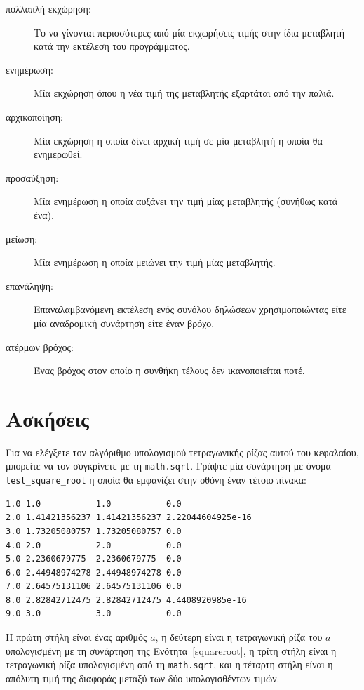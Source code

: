\documentclass[10pt]{book}
\begin{document}
\begin{description}

\item[πολλαπλή εκχώρηση:] Το να γίνονται περισσότερες από μία εκχωρήσεις τιμής στην ίδια μεταβλητή
κατά την εκτέλεση του προγράμματος.

\item[ενημέρωση:] Μία εκχώρηση όπου η νέα τιμή της μεταβλητής εξαρτάται από την παλιά.

\item[αρχικοποίηση:] Μία εκχώρηση η οποία δίνει αρχική τιμή σε μία μεταβλητή η οποία θα ενημερωθεί.

\item[προσαύξηση:] Μία ενημέρωση η οποία αυξάνει την τιμή μίας μεταβλητής (συνήθως κατά ένα).

\item[μείωση:] Μία ενημέρωση η οποία μειώνει την τιμή μίας μεταβλητής.

\item[επανάληψη:] Επαναλαμβανόμενη εκτέλεση ενός συνόλου δηλώσεων χρησιμοποιώντας είτε μία αναδρομική συνάρτηση είτε έναν βρόχο.

\item[ατέρμων βρόχος:] Ένας βρόχος στον οποίο η συνθήκη τέλους δεν ικανοποιείται ποτέ.

\end{description}


\section{Ασκήσεις}

\begin{exercise}

Για να ελέγξετε τον αλγόριθμο υπολογισμού τετραγωνικής ρίζας αυτού του κεφαλαίου, μπορείτε να τον συγκρίνετε με τη {\tt math.sqrt}. Γράψτε μία συνάρτηση με όνομα \verb"test_square_root" η οποία θα εμφανίζει στην οθόνη έναν τέτοιο πίνακα:

\begin{verbatim}
1.0 1.0           1.0           0.0
2.0 1.41421356237 1.41421356237 2.22044604925e-16
3.0 1.73205080757 1.73205080757 0.0
4.0 2.0           2.0           0.0
5.0 2.2360679775  2.2360679775  0.0
6.0 2.44948974278 2.44948974278 0.0
7.0 2.64575131106 2.64575131106 0.0
8.0 2.82842712475 2.82842712475 4.4408920985e-16
9.0 3.0           3.0           0.0

\end{verbatim}
%

Η πρώτη στήλη είναι ένας αριθμός $a$, η δεύτερη είναι η τετραγωνική
ρίζα του $a$ υπολογισμένη με τη συνάρτηση της Ενότητα~\ref{squareroot}, 
η τρίτη στήλη είναι η τετραγωνική ρίζα υπολογισμένη από τη {\tt math.sqrt},  και η τέταρτη στήλη είναι η απόλυτη τιμή της διαφοράς μεταξύ των δύο υπολογισθέντων τιμών.
\\
\end{exercise}
\end{document}
